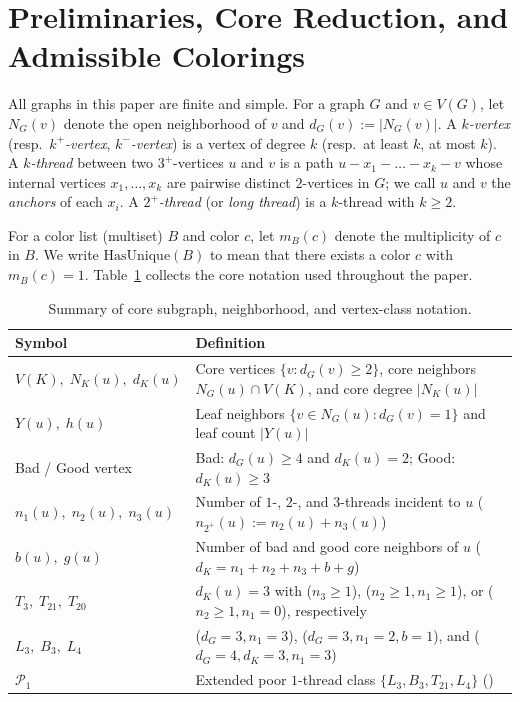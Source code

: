 \documentclass[11pt,a4paper]{article}
\theoremstyle{definition}
\newcommand{\Ppoor}{\mathcal{P}_1}
\newcommand{\code}[1]{\texttt{\detokenize{#1}}}
\begin{document}
\section{Preliminaries, Core Reduction, and Admissible Colorings}\label{sec:prelim}

All graphs in this paper are finite and simple. For a graph $G$ and $v \in V(G)$, let $N_G(v)$ denote the open neighborhood of $v$ and $d_G(v) := |N_G(v)|$. A \emph{$k$-vertex} (resp.\ \emph{$k^+$-vertex}, \emph{$k^-$-vertex}) is a vertex of degree $k$ (resp.\ at least $k$, at most $k$). A \emph{$k$-thread} between two $3^+$-vertices $u$ and $v$ is a path $u - x_1 - \dots - x_k - v$ whose internal vertices $x_1,\dots,x_k$ are pairwise distinct $2$-vertices in $G$; we call $u$ and $v$ the \emph{anchors} of each $x_i$. A \emph{$2^+$-thread} (or \emph{long thread}) is a $k$-thread with $k \ge 2$.

For a color list (multiset) $B$ and color $c$, let $m_B(c)$ denote the multiplicity of $c$ in $B$. We write $\mathrm{HasUnique}(B)$ to mean that there exists a color $c$ with $m_B(c) = 1$. Table~\ref{tab:notation} collects the core notation used throughout the paper.

\begin{table}[t]
\centering
\caption{Summary of core subgraph, neighborhood, and vertex-class notation.}
\label{tab:notation}
\small
\begin{tabular}{@{}lp{11.2cm}@{}}
\toprule
Symbol & Definition \\
\midrule
$V(K),\; N_K(u),\; d_K(u)$ & Core vertices $\{v : d_G(v) \ge 2\}$, core neighbors $N_G(u) \cap V(K)$, and core degree $|N_K(u)|$ \\
$Y(u),\; h(u)$ & Leaf neighbors $\{v \in N_G(u) : d_G(v) = 1\}$ and leaf count $|Y(u)|$ \\
Bad / Good vertex & Bad: $d_G(u) \ge 4$ and $d_K(u) = 2$; \quad Good: $d_K(u) \ge 3$ \\
$n_1(u),\; n_2(u),\; n_3(u)$ & Number of $1$-, $2$-, and $3$-threads incident to $u$ ($n_{2^+}(u) := n_2(u) + n_3(u)$) \\
$b(u),\; g(u)$ & Number of bad and good core neighbors of $u$ ($d_K = n_1 + n_2 + n_3 + b + g$) \\
$T_3,\; T_{21},\; T_{20}$ & $d_K(u)=3$ with ($n_3 \ge 1$), ($n_2 \ge 1, n_1 \ge 1$), or ($n_2 \ge 1, n_1 = 0$), respectively \\
$L_3,\; B_3,\; L_4$ & ($d_G=3, n_1=3$), ($d_G=3, n_1=2, b=1$), and ($d_G=4, d_K=3, n_1=3$) \\
$\Ppoor$ & Extended poor $1$-thread class $\{L_3, B_3, T_{21}, L_4\}$ (\code{IsPoor1Ext}) \\
\bottomrule
\end{tabular}
\end{table}
\end{document}
